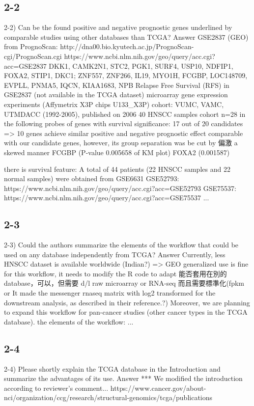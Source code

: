 \documentclass[preprint,12pt]{elsarticle}
\begin{document}
\subsection{2-2}
2-2) Can be the found positive and negative prognostic genes underlined by comparable studies using other databases than TCGA?
Answer
GSE2837 (GEO) from PrognoScan: http://dna00.bio.kyutech.ac.jp/PrognoScan-cgi/PrognoScan.cgi \cite{Mizuno2009a}
https://www.ncbi.nlm.nih.gov/geo/query/acc.cgi?acc=GSE2837 \cite{Chung2006}
DKK1, CAMK2N1, STC2, PGK1, SURF4, USP10, NDFIP1, FOXA2, STIP1, DKC1;
ZNF557, ZNF266, IL19, MYO1H, FCGBP, LOC148709, EVPLL, PNMA5, IQCN, KIAA1683, NPB
Relapse Free Survival (RFS) in GSE2837 (not available in the TCGA dataset)
microarray gene expression experiments (Affymetrix X3P chips U133_X3P)
cohort: VUMC, VAMC, UTMDACC (1992-2005), published on 2006
40 HNSCC samples
cohort n=28 in the following probes of genes with survival significance:
17 out of 20 candidates => 10 genes achieve similar positive and negative prognostic effect comparable with our candidate genes, however, its group separation was be cut by 偏激 a skewed manner
FCGBP (P-value 0.005658 of KM plot)
FOXA2 (0.001587)

there is survival feature:
A total of 44 patients (22 HNSCC samples and 22 normal samples) were obtained from GSE6631
GSE52793: https://www.ncbi.nlm.nih.gov/geo/query/acc.cgi?acc=GSE52793
GSE75537: https://www.ncbi.nlm.nih.gov/geo/query/acc.cgi?acc=GSE75537
...

\subsection{2-3}
2-3) Could the authors summarize the elements of the workflow that could be used on any database independently from TCGA?
Answer
Currently, less HNSCC dataset is available worldwide (Indian?) => GEO
generalized use is fine for this workflow, it needs to modify the R code to adapt 
能否套用在別的 database，可以，但需要 d/l raw microarray or RNA-seq 而且需要標準化(fpkm or  It made the messenger \acrshort{rnaseq} matrix with log2 transformed for the downstream analysis, as described in their reference\cite{RSEM2016}.?)
Moreover, we are planning to expand this workflow for pan-cancer studies (other cancer types in the TCGA database).
the elements of the workflow: ...

\subsection{2-4}
2-4) Please shortly explain the TCGA database in the Introduction and summarize the advantages of its use.
Answer
*** We modified the introduction according to reviewer's comment...
https://www.cancer.gov/about-nci/organization/ccg/research/structural-genomics/tcga/publications
\end{document}
